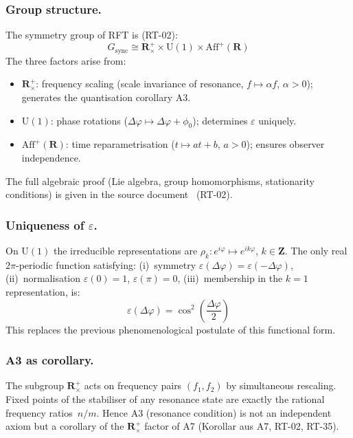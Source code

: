 \documentclass[12pt]{iopart}
\providecommand{\mathbb}[1]{\mathbf{#1}}
\begin{document}
	\subsubsection{Group structure.}
	The symmetry group of RFT is (RT-02):
	\begin{equation}
		G_{\mathrm{sync}} \cong
		\mathbb{R}^+_\times \times \mathrm{U}(1)
		\times \mathrm{Aff}^+(\mathbb{R})
		\label{eq:gsync_structure_en}
	\end{equation}
	The three factors arise from:
	\begin{itemize}
		\item $\mathbb{R}^+_\times$: frequency scaling
		(scale invariance of resonance, $f \mapsto \alpha f$,
		$\alpha > 0$); generates the quantisation corollary A3.
		\item $\mathrm{U}(1)$: phase rotations
		($\Delta\varphi \mapsto \Delta\varphi + \phi_0$);
		determines $\varepsilon$ uniquely.
		\item $\mathrm{Aff}^+(\mathbb{R})$: time reparametrisation
		($t \mapsto at + b$, $a > 0$); ensures observer independence.
	\end{itemize}
	The full algebraic proof (Lie algebra,
	group homomorphisms, stationarity conditions)
	is given in the source document~\cite{rftrepo} (RT-02).
	
	\subsubsection{Uniqueness of $\varepsilon$.}
	On $\mathrm{U}(1)$ the irreducible representations are
	$\rho_k\colon e^{i\varphi} \mapsto e^{ik\varphi}$, $k\in\mathbb{Z}$.
	The only real $2\pi$-periodic function satisfying:
	(i)~symmetry $\varepsilon(\Delta\varphi) = \varepsilon(-\Delta\varphi)$,
	(ii)~normalisation $\varepsilon(0)=1$, $\varepsilon(\pi)=0$,
	(iii)~membership in the $k{=}1$ representation, is:
	\begin{equation}
		\varepsilon(\Delta\varphi)
		= \cos^2\!\!\left(\frac{\Delta\varphi}{2}\right)
		\label{eq:eps_unique_en}
	\end{equation}
	This replaces the previous phenomenological postulate
	of this functional form.
	
	\subsubsection{A3 as corollary.}
	The subgroup $\mathbb{R}^+_\times$ acts on frequency pairs
	$(f_1, f_2)$ by simultaneous rescaling.
	Fixed points of the stabiliser of any resonance state
	are exactly the rational frequency ratios~$n/m$.
	Hence A3 (resonance condition) is not an independent axiom
	but a corollary of the $\mathbb{R}^+_\times$ factor of A7
	(Korollar aus A7, RT-02, RT-35).
	
\end{document}
